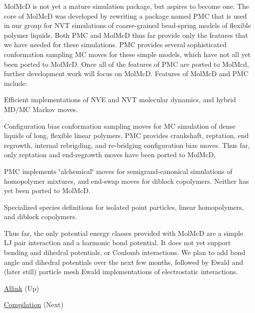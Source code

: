 \-Mol\-Mc\-D is not yet a mature simulation package, but aspires to become one. \-The core of \-Mol\-Mc\-D was developed by rewriting a package named \-P\-M\-C that is used in our group for \-N\-V\-T simulations of coarse-\/grained bead-\/spring models of flexible polymer liquids. \-Both \-P\-M\-C and \-Mol\-Mc\-D thus far provide only the features that we have needed for these simulations. \-P\-M\-C provides several sophisticated conformation sampling \-M\-C moves for these simple models, which have not all yet been ported to \-Mol\-Mc\-D. \-Once all of the features of \-P\-M\-C are ported to \-Mol\-Mcd, further development work will focus on \-Mol\-Mc\-D. \-Features of \-Mol\-Mc\-D and \-P\-M\-C include\-: 
\begin{DoxyItemize}
\item \-Efficient implementations of \-N\-V\-E and \-N\-V\-T molecular dynamics, and hybrid \-M\-D/\-M\-C \-Markov moves. 


\item \-Configuration bias conformation sampling moves for \-M\-C simulation of dense liquids of long, flexible linear polymers. \-P\-M\-C provides crankshaft, reptation, end regrowth, internal rebrigding, and re-\/bridging configuration bias moves. \-Thus far, only reptation and end-\/regrowth moves have been ported to \-Mol\-Mc\-D. 


\item \-P\-M\-C implements \char`\"{}alchemical\char`\"{} moves for semigrand-\/canonical simulations of homopolymer mixtures, and end-\/swap moves for diblock copolymers. \-Neither has yet been ported to \-Mol\-Mc\-D. 


\item \-Specialized species definitions for isolated point particles, linear homopolymers, and diblock copolymers. 


\end{DoxyItemize}\-Thus far, the only potential energy classes provided with \-Mol\-Mc\-D are a simple \-L\-J pair interaction and a harmonic bond potential. \-It does not yet support bending and dihedral potentials, or \-Coulomb interactions. \-We plan to add bond angle and dihedral potentials over the next few months, followed by \-Ewald and (later still) particle mesh \-Ewald implementations of electrostatic interactions.


\begin{DoxyItemize}
\item \hyperlink{index}{\-Allink} (\-Up)  
\item \hyperlink{compile_page}{\-Compilation} (\-Next)  
\end{DoxyItemize}